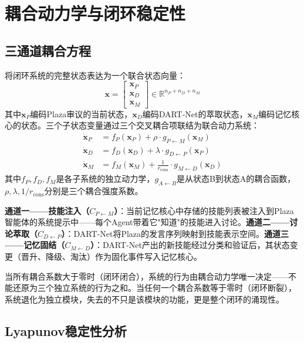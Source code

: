 \documentclass[12pt,a4paper]{ctexart}
\begin{document}
\section{耦合动力学与闭环稳定性}

\subsection{三通道耦合方程}

将闭环系统的完整状态表达为一个联合状态向量：
\begin{equation}
\mathbf{x} = \begin{bmatrix}
\mathbf{x}_P \\ \mathbf{x}_D \\ \mathbf{x}_M
\end{bmatrix} \in \mathbb{R}^{n_P + n_D + n_M}
\label{eq:unified_state}
\end{equation}
其中$\mathbf{x}_P$编码Plaza审议的当前状态，$\mathbf{x}_D$编码DART-Net的萃取状态，$\mathbf{x}_M$编码记忆核心的状态。三个子状态变量通过三个交叉耦合项联结为联合动力系统：
\begin{align}
\dot{\mathbf{x}}_P &= f_P(\mathbf{x}_P) + \rho \cdot g_{P \leftarrow M}(\mathbf{x}_M) \label{eq:dot_P} \\
\dot{\mathbf{x}}_D &= f_D(\mathbf{x}_D) + \lambda \cdot g_{D \leftarrow P}(\mathbf{x}_P) \label{eq:dot_D} \\
\dot{\mathbf{x}}_M &= f_M(\mathbf{x}_M) + \frac{1}{r_{\text{cons}}} \cdot g_{M \leftarrow D}(\mathbf{x}_D) \label{eq:dot_M}
\end{align}
其中$f_P, f_D, f_M$是各子系统的独立动力学，$g_{A \leftarrow B}$是从状态B到状态A的耦合函数，$\rho, \lambda, 1/r_{\text{cons}}$分别是三个耦合强度系数。

\textbf{通道一——技能注入（$C_{P \leftarrow M}$）}：当前记忆核心中存储的技能列表被注入到Plaza智能体的系统提示中——每个Agent带着它"知道"的技能进入讨论。\textbf{通道二——讨论萃取（$C_{D \leftarrow P}$）}：DART-Net将Plaza的发言序列映射到技能表示空间。\textbf{通道三——记忆固结（$C_{M \leftarrow D}$）}：DART-Net产出的新技能经过分类和验证后，其状态变更（晋升、降级、淘汰）作为固化事件写入记忆核心。

当所有耦合系数大于零时（闭环闭合），系统的行为由耦合动力学唯一决定——不能还原为三个独立系统的行为之和。当任何一个耦合系数等于零时（闭环断裂），系统退化为独立模块，失去的不只是该模块的功能，更是整个闭环的涌现性。

\subsection{Lyapunov稳定性分析}
\end{document}
